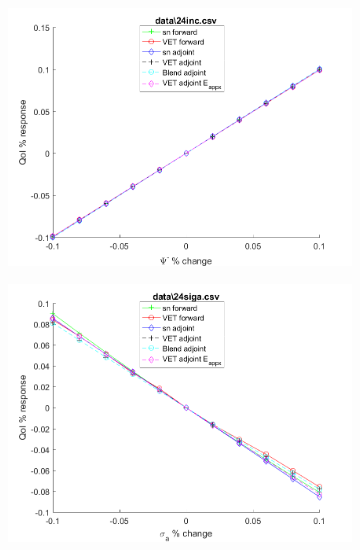 \documentclass[12pt]{report}
\begin{document}
\begin{figure}[H]
\label{Trial3}
\centering
\begin{subfigure}{.5\textwidth}
  \centering
  \includegraphics[width=.98\linewidth]{figures2/24incSens.png}
  \label{T3:sfig1}
\end{subfigure}%
\begin{subfigure}{.5\textwidth}
  \centering
  \includegraphics[width=.98\linewidth]{figures2/24sigaSens.png}
  \label{T3:sfig2}
\end{subfigure}
%
\begin{subfigure}{.5\textwidth}
  \centering

\end{subfigure}
\end{figure}
\end{document}
